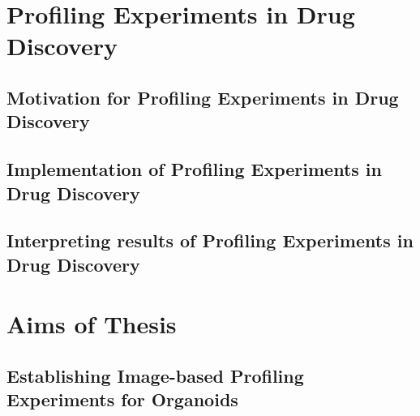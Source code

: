 \begin{flushleft}
\section{Profiling Experiments in Drug Discovery}

\subsection{Motivation for Profiling Experiments in Drug Discovery}
\subsection{Implementation of Profiling Experiments in Drug Discovery}
\subsection{Interpreting results of Profiling Experiments in Drug Discovery}



\section{Aims of Thesis}
\subsection{Establishing Image-based Profiling Experiments for Organoids}


\end{flushleft}
